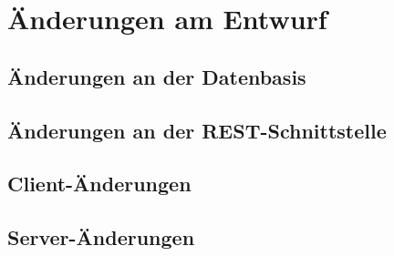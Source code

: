 \FloatBarrier
\section{Änderungen am Entwurf}

\FloatBarrier
\subsection{Änderungen an der Datenbasis}
\label{subsec:changes_database}



\FloatBarrier
\subsection{Änderungen an der REST-Schnittstelle}
\label{subsec:changes_rest}



\FloatBarrier
\subsection{Client-Änderungen}



\FloatBarrier
\subsection{Server-Änderungen}

